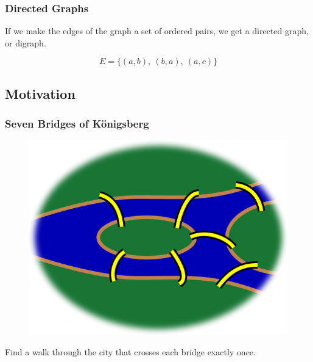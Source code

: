 \documentclass{beamer}
\theoremstyle{Plain}\newtheorem{kt}{Kuratowski's Theorem}
\theoremstyle{Definition}\newtheorem{te}{Tr\'emaux Exploration}
\theoremstyle{Definition}\newtheorem{dfs}{Depth-First Search}
\begin{document}
\begin{frame}
  \frametitle{Directed Graphs}
  If we make the edges of the graph a set of ordered pairs, we get a \alert{directed graph}, or digraph.
    \begin{figure}[h]
      \begin{equation*}
        E = \{\left( a,b\right) ,\ \left( b,a\right) ,\ \left( a,c\right) \}
      \end{equation*}
    \end{figure}
\end{frame}

\subsection{Motivation}
\begin{frame}
  \frametitle{Seven Bridges of K\"onigsberg}
  \begin{figure}[h]
  \includegraphics[height=.6\textheight]{images/7bridges.png}
  \end{figure}
  Find a walk through the city that crosses each bridge exactly once.
\end{frame}
\end{document}
